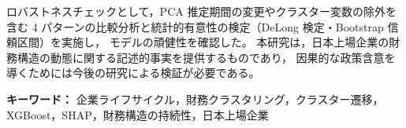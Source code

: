\documentclass[
  book,                     %
  paper        = a4,
  fontsize     = 11pt,      %
  head_space   = 25mm,      %
  foot_space   = 25mm,      %
  gutter       = 30mm,      %
  fore-edge    = 25mm,      %
  line_length  = 42zw,      %
  number_of_lines = 38,     %
  titlepage,
  twoside,
]{jlreq}
\begin{document}
ロバストネスチェックとして，PCA 推定期間の変更やクラスター変数の除外を含む
4 パターンの比較分析と統計的有意性の検定（DeLong 検定・Bootstrap 信頼区間）を実施し，
モデルの頑健性を確認した。
本研究は，日本上場企業の財務構造の動態に関する記述的事実を提供するものであり，
因果的な政策含意を導くためには今後の研究による検証が必要である。

\vspace{5mm}
\noindent\textbf{キーワード：}
企業ライフサイクル，財務クラスタリング，クラスター遷移，
XGBoost，SHAP，財務構造の持続性，日本上場企業

\cleardoublepage
\tableofcontents

\cleardoublepage
\listoffigures
\listoftables

\mainmatter   %








\cleardoublepage
\printbibliography[heading=bibintoc, title=参考文献]

% 
\end{document}
